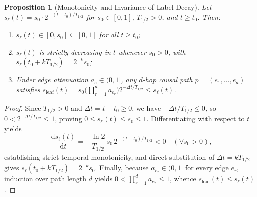 \documentclass[10pt,twocolumn,letterpaper]{article}
\makeatletter
\theoremstyle{plain}
\newtheorem{proposition}[theorem]{Proposition}
\theoremstyle{definition}
\theoremstyle{remark}
\DeclareRobustCommand{\_}{\ifmmode\nfss@text{\textunderscore}\else\textunderscore\penalty\@highpenalty\hskip\z@skip\fi}
\makeatother
\begin{document}
\begin{proposition}[Monotonicity and Invariance of Label Decay]
\label{prop:decay}
Let $s_\ell(t) = s_0 \cdot 2^{-(t - t_0)/T_{1/2}}$ for $s_0 \in [0, 1]$, $T_{1/2} > 0$, and $t \ge t_0$. Then:
\begin{enumerate}[leftmargin=1.5em,itemsep=1pt,topsep=2pt]
  \item $s_\ell(t) \in [0, s_0] \subseteq [0, 1]$ for all $t \ge t_0$;
  \item $s_\ell(t)$ is strictly decreasing in $t$ whenever $s_0 > 0$, with $s_\ell(t_0 + k T_{1/2}) = 2^{-k} s_0$;
  \item Under edge attenuation $a_e \in (0, 1]$, any $d$-hop causal path $p = (e_1, \dots, e_d)$ satisfies $s_{\text{leaf}}(t) = s_0 \big(\prod_{r=1}^{d} a_{e_r}\big) 2^{-\Delta t / T_{1/2}} \le s_\ell(t)$.
\end{enumerate}
\end{proposition}
\begin{proof}
Since $T_{1/2} > 0$ and $\Delta t = t - t_0 \ge 0$, we have $-\Delta t / T_{1/2} \le 0$, so $0 < 2^{-\Delta t / T_{1/2}} \le 1$, proving $0 \le s_\ell(t) \le s_0 \le 1$. Differentiating with respect to $t$ yields
\[
  \frac{\mathrm{d}s_\ell(t)}{\mathrm{d}t} = -\frac{\ln 2}{T_{1/2}}\, s_0 \, 2^{-(t - t_0)/T_{1/2}} < 0 \quad (\forall s_0 > 0),
\]
establishing strict temporal monotonicity, and direct substitution of $\Delta t = k T_{1/2}$ gives $s_\ell(t_0 + k T_{1/2}) = 2^{-k}s_0$. Finally, because $a_{e_r} \in (0, 1]$ for every edge $e_r$, induction over path length $d$ yields $0 < \prod_{r=1}^{d} a_{e_r} \le 1$, whence $s_{\text{leaf}}(t) \le s_\ell(t)$.
\end{proof}
\end{document}
